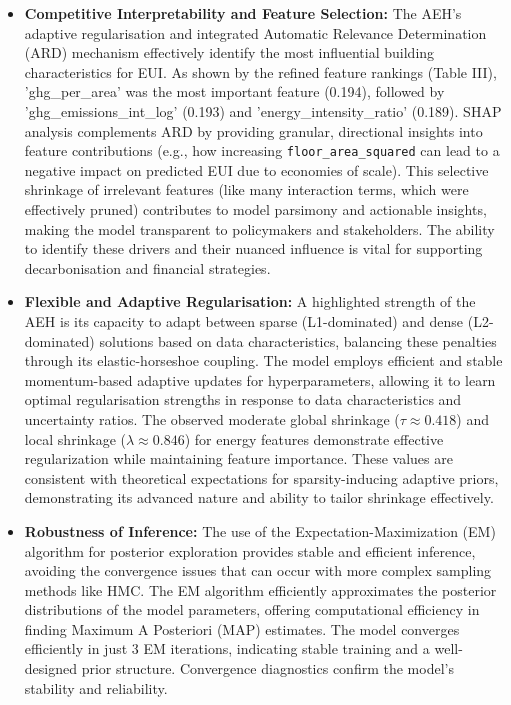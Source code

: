 \begin{itemize}
\item \textbf{Competitive Interpretability and Feature Selection:} The AEH's adaptive regularisation and integrated Automatic Relevance Determination (ARD) mechanism effectively identify the most influential building characteristics for EUI. As shown by the refined feature rankings (Table III), 'ghg\_per\_area' was the most important feature (0.194), followed by 'ghg\_emissions\_int\_log' (0.193) and 'energy\_intensity\_ratio' (0.189). SHAP analysis complements ARD by providing granular, directional insights into feature contributions (e.g., how increasing \texttt{floor\_area\_squared} can lead to a negative impact on predicted EUI due to economies of scale). This selective shrinkage of irrelevant features (like many interaction terms, which were effectively pruned) contributes to model parsimony and actionable insights, making the model transparent to policymakers and stakeholders. The ability to identify these drivers and their nuanced influence is vital for supporting decarbonisation and financial strategies.

\item \textbf{Flexible and Adaptive Regularisation:} A highlighted strength of the AEH is its capacity to adapt between sparse (L1-dominated) and dense (L2-dominated) solutions based on data characteristics, balancing these penalties through its elastic-horseshoe coupling. The model employs efficient and stable momentum-based adaptive updates for hyperparameters, allowing it to learn optimal regularisation strengths in response to data characteristics and uncertainty ratios. The observed moderate global shrinkage ($\tau \approx 0.418$) and local shrinkage ($\lambda \approx 0.846$) for energy features demonstrate effective regularization while maintaining feature importance. These values are consistent with theoretical expectations for sparsity-inducing adaptive priors, demonstrating its advanced nature and ability to tailor shrinkage effectively.

\item \textbf{Robustness of Inference:} The use of the Expectation-Maximization (EM) algorithm for posterior exploration provides stable and efficient inference, avoiding the convergence issues that can occur with more complex sampling methods like HMC. The EM algorithm efficiently approximates the posterior distributions of the model parameters, offering computational efficiency in finding Maximum A Posteriori (MAP) estimates. The model converges efficiently in just 3 EM iterations, indicating stable training and a well-designed prior structure. Convergence diagnostics confirm the model's stability and reliability.


\end{itemize}
